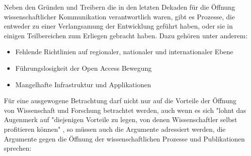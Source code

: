 Neben den Gründen und Treibern die in den letzten Dekaden für die Öffnung wissenschaftlicher Kommunikation verantwortlich waren, gibt es Prozesse, die entweder zu einer Verlangsamung der Entwicklung geführt haben, oder sie in einigen Teilbereichen zum Erliegen gebracht haben. Dazu gehören unter anderem:
\begin{itemize}
\item Fehlende Richtlinien auf regionaler, nationaler und internationaler Ebene
\item Führungslosigkeit der Open Access Bewegung
\item Mangelhafte Infrastruktur und Applikationen
\end{itemize}

Für eine ausgewogene Betrachtung darf nicht nur auf die Vorteile der Öffnung von Wissenschaft und Forschung betrachtet werden, auch wenn es sich "lohnt das Augenmerk auf "diejenigen Vorteile zu legen, von denen Wissenschaftler selbst profitieren können" \cite{muller_2010_open}, so müssen auch die Argumente adressiert werden, die Argumente gegen die Öffnung der wissenschaftlichen Prozesse und Publikationen sprechen:
